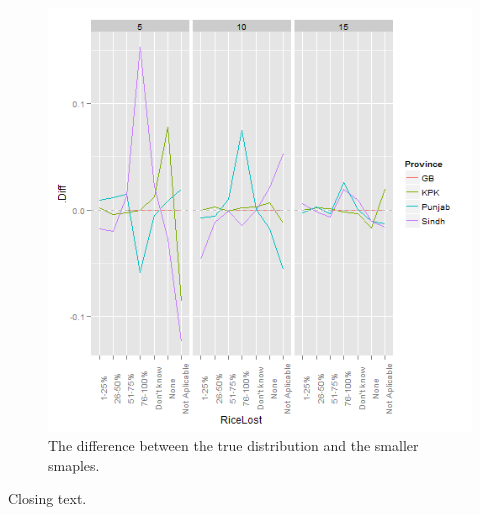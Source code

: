\begin{knitrout}
\begin{kframe}
\begin{flushleft}
\hlstd{}{\ }{\ }{\ }{\ }\hlkeyword{(}\hlkeyword{\urltilda{}}\hlkeyword{)}{\ }\hlkeyword{+}{\ }\hlkeyword{(}\hlargument{=}{\ }\hlkeyword{,}{\ }\hlargument{=}{\ }\hlkeyword{,}\hspace*{\fill}\\
\hlstd{}{\ }{\ }{\ }{\ }\hlargument{=}{\ }\hlkeyword{)}\mbox{}
\normalfont
\end{flushleft}
\end{kframe}
\end{knitrout}


\begin{figure}[!hbtp]
\begin{knitrout}
\color{fgcolor}

{\centering \includegraphics[width=.9\linewidth]{smallerDist/figures/distErrorsPlot} 

}


\end{knitrout}

\caption[Distribution Differences.]{The difference between the true distribution and the smaller smaples.\label{fig:distErrors}}
\end{figure}

Closing text.
